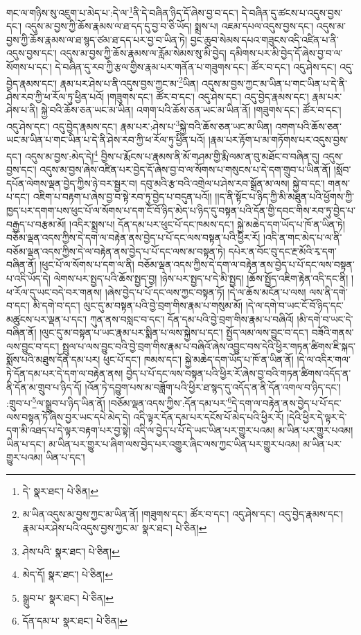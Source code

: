 གང་ལ་གཉིས་སུ་འཇུག་པ་མེད་པ་:དེ་ལ་\footnote{དེ་  སྣར་ཐང་།  པེ་ཅིན། }ནི་དེ་བཞིན་ཉིད་དོ་ཞེས་བྱ་བ་དང་། དེ་བཞིན་དུ་ཚངས་པ་འདུས་བྱས་དང་། འདུས་མ་བྱས་ཀྱི་ཆོས་རྣམས་ལ་ཐ་དད་དུ་བྱ་བ་ཅི་ཡོད། སྨྲས་པ། འཇམ་དཔལ་འདུས་བྱས་དང་། འདུས་མ་བྱས་ཀྱི་ཆོས་རྣམས་ལ་ཐ་སྙད་ཙམ་ཐ་དད་པར་བྱ་བ་ཡིན་ཏེ། བྱང་ཆུབ་སེམས་དཔའ་གཟུངས་འདི་འཛིན་པ་ནི་འདུས་བྱས་དང་། འདུས་མ་བྱས་ཀྱི་ཆོས་རྣམས་ལ་རློམ་སེམས་སུ་མི་བྱེད། དམིགས་པར་མི་བྱེད་དོ་ཞེས་བྱ་བ་ལ་སོགས་པ་དང་། དེ་བཞིན་དུ་རབ་ཀྱི་རྩལ་གྱིས་རྣམ་པར་གནོན་པ་གཟུགས་དང་། ཚོར་བ་དང་། འདུ་ཤེས་དང་། འདུ་བྱེད་རྣམས་དང་། རྣམ་པར་ཤེས་པ་ནི་འདུས་བྱས་ཀྱང་མ་\footnote{མ་ཡིན་འདུས་མ་བྱས་ཀྱང་མ་ཡིན་ནོ། །གཟུགས་དང་། ཚོར་བ་དང་། འདུ་ཤེས་དང་། འདུ་བྱེད་རྣམས་དང་། རྣམ་པར་ཤེས་པའི་འདུས་བྱས་ཀྱང་མ་  སྣར་ཐང་།  པེ་ཅིན། }ཡིན། འདུས་མ་བྱས་ཀྱང་མ་ཡིན་པ་གང་ཡིན་པ་དེ་ནི་ཤེས་རབ་ཀྱི་ཕ་རོལ་ཏུ་ཕྱིན་པའོ། །གཟུགས་དང་། ཚོར་བ་དང་། འདུ་ཤེས་དང་། འདུ་བྱེད་རྣམས་དང་། རྣམ་པར་ཤེས་པ་ནི། སྐྱེ་བའི་ཆོས་ཅན་ཡང་མ་ཡིན། འགག་པའི་ཆོས་ཅན་ཡང་མ་ཡིན་ནོ། །གཟུགས་དང་། ཚོར་བ་དང་། འདུ་ཤེས་དང་། འདུ་བྱེད་རྣམས་དང་། རྣམ་པར་:ཤེས་པ་\footnote{ཤེས་པའི་  སྣར་ཐང་།  པེ་ཅིན། }སྐྱེ་བའི་ཆོས་ཅན་ཡང་མ་ཡིན། འགག་པའི་ཆོས་ཅན་ཡང་མ་ཡིན་པ་གང་ཡིན་པ་དེ་ནི་ཤེས་རབ་ཀྱི་ཕ་རོལ་ཏུ་ཕྱིན་པའོ། །རྣམ་པར་རྟོག་པ་མ་གཏོགས་པར་འདུས་བྱས་དང་། འདུས་མ་བྱས་:མེད་དེ།\footnote{མེད་དོ།  སྣར་ཐང་།  པེ་ཅིན། } བྱིས་པ་རྨོངས་པ་རྣམས་ནི་མོ་གཤམ་གྱི་རྨི་ལམ་ན་བུ་མཐོང་བ་བཞིན་དུ། འདུས་བྱས་དང་། འདུས་མ་བྱས་ཞེས་འཛིན་པར་བྱེད་དོ་ཞེས་བྱ་བ་ལ་སོགས་པ་གསུངས་པ་དེ་དག་གྲུབ་པ་ཡིན་ནོ། །སློབ་དཔོན་ལེགས་ལྡན་བྱེད་ཀྱིས་ཉེ་བར་སྦྱར་བ། དབུ་མའི་རྩ་བའི་འགྲེལ་པ་ཤེས་རབ་སྒྲོན་མ་ལས། སྐྱེ་བ་དང་། གནས་པ་དང་། འཇིག་པ་བརྟག་པ་ཞེས་བྱ་བ་སྟེ་རབ་ཏུ་བྱེད་པ་བདུན་པའོ།། །།ད་ནི་སྟོང་པ་ཉིད་ཀྱི་མི་མཐུན་པའི་ཕྱོགས་ཀྱི་ཁྱད་པར་དགག་པས་ཕུང་པོ་ལ་སོགས་པ་དག་ངོ་བོ་ཉིད་མེད་པ་ཉིད་དུ་བསྟན་པའི་དོན་གྱི་དབང་གིས་རབ་ཏུ་བྱེད་པ་བརྒྱད་པ་བརྩམ་མོ། །འདིར་སྨྲས་པ། དོན་དམ་པར་ཕུང་པོ་དང་ཁམས་དང་། སྐྱེ་མཆེད་དག་ཡོད་པ་ཁོ་ན་ཡིན་ཏེ། བཅོམ་ལྡན་འདས་ཀྱིས་དེ་དག་ལ་བརྟེན་ནས་བྱེད་པ་པོ་དང་ལས་བསྟན་པའི་ཕྱིར་རོ། །འདི་ན་གང་མེད་པ་ལ་ནི་བཅོམ་ལྡན་འདས་ཀྱིས་དེ་ལ་བརྟེན་ནས་བྱེད་པ་པོ་དང་ལས་མ་བསྟན་ཏེ། དཔེར་ན་བོང་བུ་དང་རྔ་མོའི་རྭ་དག་བཞིན་ནོ། །ཕུང་པོ་ལ་སོགས་པ་དག་ལ་ནི། བཅོམ་ལྡན་འདས་ཀྱིས་དེ་དག་ལ་བརྟེན་ནས་བྱེད་པ་པོ་དང་ལས་བསྟན་པ་འདི་ཡོད་དེ། ལེགས་པར་སྤྱད་པའི་ཆོས་སྤྱད་བྱ། །ཉེས་པར་སྤྱད་པ་དེ་མི་སྤྱད། །ཆོས་སྤྱོད་འཇིག་རྟེན་འདི་དང་ནི། །ཕ་རོལ་དུ་ཡང་བདེ་བར་གནས། །ཞེས་བྱེད་པ་པོ་དང་ལས་ཀྱང་བསྟན་ཏོ། །དེ་ལ་ཆོས་མངོན་པ་ལས། ལས་ནི་དགེ་བ་དང་། མི་དགེ་བ་དང་། ལུང་དུ་མ་བསྟན་པའི་བྱེ་བྲག་གིས་རྣམ་པ་གསུམ་མོ། །དེ་ལ་དགེ་བ་ཡང་ངོ་བོ་ཉིད་དང་མཚུངས་པར་ལྡན་པ་དང་། ཀུན་ནས་བསླང་བ་དང་། དོན་དམ་པའི་བྱེ་བྲག་གིས་རྣམ་པ་བཞིའོ། །མི་དགེ་བ་ཡང་དེ་བཞིན་ནོ། །ལུང་དུ་མ་བསྟན་པ་ཡང་རྣམ་པར་སྨིན་པ་ལས་སྐྱེས་པ་དང་། སྤྱོད་ལམ་ལས་བྱུང་བ་དང་། བཟོའི་གནས་ལས་བྱུང་བ་དང་། སྤྲུལ་པ་ལས་བྱུང་བའི་བྱེ་བྲག་གིས་རྣམ་པ་བཞིའོ་ཞེས་འབྱུང་བས་དེའི་ཕྱིར་གཏན་ཚིགས་ཇི་སྐད་སྨོས་པའི་མཐུས་དོན་དམ་པར། ཕུང་པོ་དང་། ཁམས་དང་། སྐྱེ་མཆེད་དག་ཡོད་པ་ཁོ་ན་ཡིན་ནོ། །དེ་ལ་འདིར་གལ་ཏེ་དོན་དམ་པར་དེ་དག་ལ་བརྟེན་ནས། བྱེད་པ་པོ་དང་ལས་བསྟན་པའི་ཕྱིར་རོ་ཞེས་བྱ་བའི་གཏན་ཚིགས་འདོད་ན་ནི་དོན་མ་གྲུབ་པ་ཉིད་དོ། །འོན་ཏེ་དབྱུག་པས་མ་བཟློག་པའི་ཕྱིར་ཐ་སྙད་དུ་འདོད་ན་ནི་དོན་འགལ་བ་ཉིད་དང་། :གྲུབ་པ་\footnote{སྒྲུབ་པ་  སྣར་ཐང་།  པེ་ཅིན། }ལ་སྒྲུབ་པ་ཉིད་ཡིན་ནོ། །བཅོམ་ལྡན་འདས་ཀྱིས་:དོན་དམ་པར་\footnote{དོན་དམ་པ་  སྣར་ཐང་།  པེ་ཅིན། }དེ་དག་ལ་བརྟེན་ནས་བྱེད་པ་པོ་དང་ལས་བསྟན་ཏོ་ཞེས་བྱར་ཡང་དཔེ་མེད་དེ། འདི་ལྟར་དོན་དམ་པར་དངོས་པོ་མེད་པའི་ཕྱིར་རོ། །དེའི་ཕྱིར་དེ་ལྟར་དེ་དག་མི་འཐད་པ་དེ་ལྟར་བརྟག་པར་བྱ་སྟེ། འདི་ལ་བྱེད་པ་པོ་དེ་ཡང་ཡིན་པར་གྱུར་པའམ། མ་ཡིན་པར་གྱུར་པའམ། ཡིན་པ་དང་། མ་ཡིན་པར་གྱུར་པ་ཞིག་ལས་བྱེད་པར་འགྱུར་ཞིང་ལས་ཀྱང་ཡིན་པར་གྱུར་པའམ། མ་ཡིན་པར་གྱུར་པའམ། ཡིན་པ་དང་། 